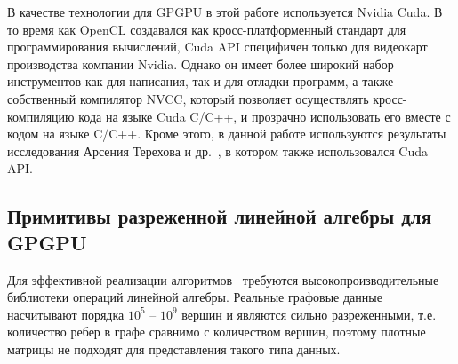 В качестве технологии для GPGPU в этой работе используется Nvidia Cuda. В то время как OpenCL создавался как кросс-платформенный стандарт для программирования вычислений, Cuda API специфичен только для видеокарт производства компании Nvidia. Однако он имеет более широкий набор инструментов как для написания, так и для отладки программ, а также собственный компилятор NVCC, который позволяет осуществлять кросс-компиляцию кода на языке Cuda C/C++, и прозрачно использовать его вместе с кодом на языке C/C++. Кроме этого, в данной работе используются результаты исследования Арсения Терехова и др.~\cite{inproceedings:cfqp_matrix_with_single_source}, в котором также использовался Cuda API.

\subsection{Примитивы разреженной линейной алгебры для GPGPU}

Для эффективной реализации алгоритмов~\cite{inbook:kronecker_cfpq_adbis, inproceedings:matrix_cfpq} требуются высокопроизводительные библиотеки операций линейной алгебры. 
Реальные графовые данные насчитывают порядка $10^5$ -- $10^9$ вершин и являются сильно разреженными, т.е. количество ребер в графе сравнимо с количеством вершин, поэтому плотные матрицы не подходят для представления такого типа данных. 



